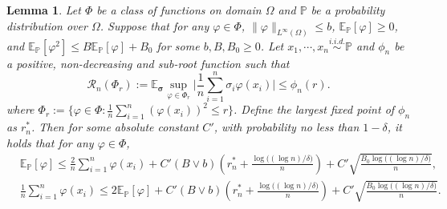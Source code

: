 \documentclass{article}
\numberwithin{equation}{section}
\newcommand{\E}{\mathbb{E}}
\newtheorem{lemma}[thm]{Lemma}
\theoremstyle{definition}
\renewcommand{\P}{\mathbb{P}}
\begin{document}
\begin{lemma}\label{lem:local_rademacher}
    Let $\Phi$ be a class of functions on domain $\Omega$ and $\P$ be a probability distribution over $\Omega$. 
    Suppose that for any $\varphi\in\Phi$, $\|\varphi\|_{L^\infty(\Omega)}\leq b$, $\E_\P [\varphi]\geq 0$, and $\E_\P [\varphi^2] \leq B\E_\P [\varphi]+B_0$ for some $b,B,B_0\geq 0$. 
    Let $x_1,\cdots,x_n\overset{\textit{i.i.d.}}{\sim}\P$ and $\phi_n$ be a positive, non-decreasing and sub-root function such that
    \begin{equation}
        \mathcal{R}_n(\Phi_r):=\E_{\bm{\sigma}} \sup_{\varphi\in\Phi_r}\Big|\frac{1}{n}\sum_{i=1}^n\sigma_i\varphi(x_i)\Big|\leq \phi_n(r).
    \end{equation}
    where $\Phi_r:= \Big\{\varphi\in\Phi: \frac{1}{n}\sum_{i=1}^n{(\varphi(x_i))^2}\leq r\Big\}$.
    Define the largest fixed point of $\phi_n$ as $r_n^*$.
    Then for some absolute constant $C'$, with probability no less than $1-\delta$, it holds that for any $\varphi\in\Phi$,
    \begin{align}
        &\E_\P[\varphi]\leq \frac{2}{n}\sum_{i=1}^n\varphi(x_i) + C'(B\vee b)\left(r_n^* + \frac{\log\big((\log n)/\delta\big)}{n}\right)+C'\sqrt{\frac{B_0\log\big((\log n)/\delta\big)}{n}},\\
        &\frac{1}{n}\sum_{i=1}^n\varphi(x_i)\leq 2\E_\P[\varphi] + C'(B\vee b)\left(r_n^* + \frac{\log\big((\log n)/\delta\big)}{n}\right)+C'\sqrt{\frac{B_0\log\big((\log n)/\delta\big)}{n}}. 
    \end{align}
\end{lemma}
\end{document}
